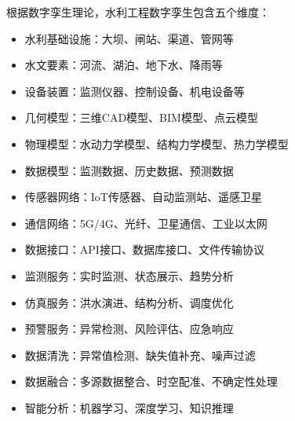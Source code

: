 根据数字孪生理论，水利工程数字孪生包含五个维度：


\begin{itemize}
\tightlist
\item
  水利基础设施：大坝、闸站、渠道、管网等
\item
  水文要素：河流、湖泊、地下水、降雨等
\item
  设备装置：监测仪器、控制设备、机电设备等
\end{itemize}


\begin{itemize}
\tightlist
\item
  几何模型：三维CAD模型、BIM模型、点云模型
\item
  物理模型：水动力学模型、结构力学模型、热力学模型
\item
  数据模型：监测数据、历史数据、预测数据
\end{itemize}


\begin{itemize}
\tightlist
\item
  传感器网络：IoT传感器、自动监测站、遥感卫星
\item
  通信网络：5G/4G、光纤、卫星通信、工业以太网
\item
  数据接口：API接口、数据库接口、文件传输协议
\end{itemize}


\begin{itemize}
\tightlist
\item
  监测服务：实时监测、状态展示、趋势分析
\item
  仿真服务：洪水演进、结构分析、调度优化
\item
  预警服务：异常检测、风险评估、应急响应
\end{itemize}


\begin{itemize}
\tightlist
\item
  数据清洗：异常值检测、缺失值补充、噪声过滤
\item
  数据融合：多源数据整合、时空配准、不确定性处理
\item
  智能分析：机器学习、深度学习、知识推理
\end{itemize}

